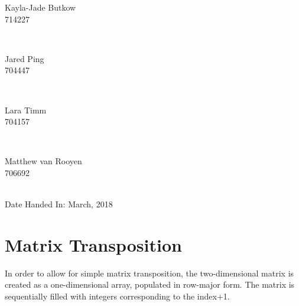 \documentclass[10pt,twocolumn]{witseiepaper}
\begin{document}
\begin{titlepage}
		
		\begin{minipage}{0.4\textwidth}
			\begin{flushleft} \large
				Kayla-Jade Butkow \\ 714227 %
			\end{flushleft}
		\end{minipage}
		~
		\begin{minipage}{0.4\textwidth}
			\begin{flushright} \large
				Jared Ping \\ 704447
			\end{flushright}
		\end{minipage}\\[1cm]
		
		\begin{minipage}{0.4\textwidth}
			\begin{flushleft} \large
				Lara Timm \\ 704157
			\end{flushleft}
		\end{minipage}
		~
		\begin{minipage}{0.4\textwidth}
			\begin{flushright} \large
				Matthew van Rooyen \\ 706692
			\end{flushright}
		\end{minipage}\\[1cm]
		
		
		
		{\large Date Handed In:  March, 2018}\\[1cm] 
		
	\end{titlepage}


\pagestyle{plain}
\setcounter{page}{1}
\onecolumn
%
\section{Matrix Transposition}
In order to allow for simple matrix transposition, the two-dimensional matrix is created as a one-dimensional array, populated in row-major form. The matrix is sequentially filled with integers corresponding to the index+1.
\end{document}
